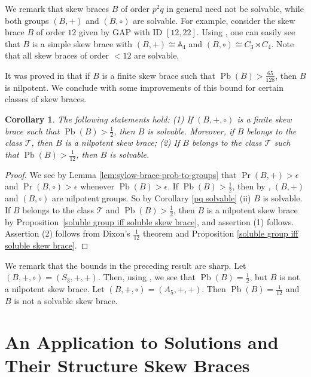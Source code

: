 \documentclass[10pt,a4paper]{amsart}
\numberwithin{equation}{section}
\newtheorem{cor}[equation]{Corollary}
\newcommand{\Pb}{\operatorname{Pb} }
\renewcommand{\Pr}{\operatorname{Pr} }
\begin{document}
We remark that skew braces $B$ of order $p^2q$ in general  need not be solvable, while both groups $(B,+)$ and $(B,\circ)$ are solvable. For example, consider the skew brace $B$ of order $12$ given by GAP \cite{GAP} with ID $[12,22]$.  Using \cite{VK22}, one can easily see that $B$ is a  simple skew brace with $(B,+)\cong \mathbb{A}_4$ and $(B,\circ) \cong C_3\rtimes C_4$. Note that all skew braces of order $< 12$ are solvable.

It was proved in \cite[Theorem 4.5.]{MY26} that if $B$ is a finite skew brace such that $\Pb(B) > \frac{65}{128}$, then $B$ is nilpotent. We conclude with some improvements of this bound for certain classes of skew braces.

\begin{cor}\label{1\2 and 1\12 solvable}
The following statements hold: (1) If $(B,+,\circ)$ is a finite skew brace such that $\Pb(B)>\frac12$, then $B$ is solvable. Moreover, if $B$ belongs to the class $\mathcal{T}$, then $B$ is a nilpotent skew brace; (2) If $B$ belongs to the class $\mathcal{T}$ such that $\Pb(B) > \frac{1}{12}$, then $B$ is solvable.
\end{cor}
\begin{proof}
   We see by Lemma \ref{lem:sylow-brace-prob-to-groups} that $\Pr (B,+)>\epsilon $ and $\Pr (B,\circ)>\epsilon$ whenever $\Pb(B) > \epsilon$. If $\Pb(B)>\frac12$, then by \cite[Theorem 5.1.]{PL95}, $(B,+)$ and $(B,\circ)$ are nilpotent groups. So by Corollary \ref{pq solvable} (ii) $B$ is  solvable. If $B$ belongs to the class $\mathcal T$ and $\Pb(B)>\frac12$, then $B$ is a nilpotent skew brace by Proposition~\ref{soluble group iff soluble skew brace}, and assertion (1) follows. Assertion (2) follows from Dixon's $\frac{1}{12}$ theorem \cite{D73}  and Proposition \ref{soluble group iff soluble skew brace}.
\end{proof}



 We remark that the bounds in the preceding result are sharp.  Let $(B,+,\circ)= (S_3,+,+)$. Then, using \cite{VK22}, we see that  $\Pb(B) = \frac{1}{2}$, but $B$ is not a nilpotent skew brace.  Let $(B,+,\circ)= (A_5,+,+)$. Then $\Pb(B) = \frac{1}{12}$ and $B$ is not a solvable skew brace.
   




\section{An Application to Solutions and Their Structure Skew Braces}
\end{document}

